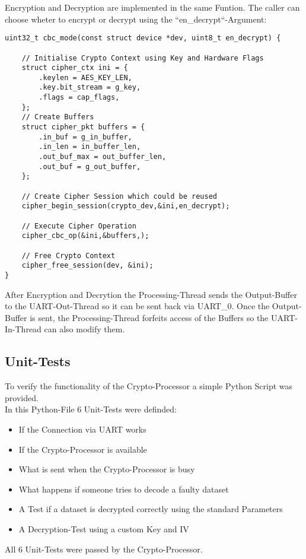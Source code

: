 Encryption and Decryption are implemented in the same Funtion.
The caller can choose wheter to encrypt or decrypt using the
``en\_decrypt``-Argument:

\begin{lstlisting}[style=CStyle,caption=Encryption and Decryption Pseudo-Code]
uint32_t cbc_mode(const struct device *dev, uint8_t en_decrypt) {

	// Initialise Crypto Context using Key and Hardware Flags
	struct cipher_ctx ini = {
		.keylen = AES_KEY_LEN,
		.key.bit_stream = g_key,
		.flags = cap_flags,
	};
	// Create Buffers
	struct cipher_pkt buffers = {
		.in_buf = g_in_buffer,
		.in_len = in_buffer_len,
		.out_buf_max = out_buffer_len,
		.out_buf = g_out_buffer,
	};

	// Create Cipher Session which could be reused
	cipher_begin_session(crypto_dev,&ini,en_decrypt);

	// Execute Cipher Operation
	cipher_cbc_op(&ini,&buffers,);

	// Free Crypto Context
	cipher_free_session(dev, &ini);
}
\end{lstlisting}

After Encryption and Decrytion the Processing-Thread sends the Output-Buffer
to the UART-Out-Thread so it can be sent back via UART\_0.
Once the Output-Buffer is sent, the Processing-Thread forfeits access of
the Buffers so the UART-In-Thread can also modify them.

\pagebreak

\subsection{Unit-Tests}

To verify the functionality of the Crypto-Processor a simple Python Script
was provided.
\\
In this Python-File 6 Unit-Tests were definded:

\begin{itemize}
	\item If the Connection via UART works
	\item If the Crypto-Processor is available
	\item What is sent when the Crypto-Processor is busy
	\item What happens if someone tries to decode a faulty dataset
	\item A Test if a dataset is decrypted correctly using the standard Parameters
	\item A Decryption-Test using a custom Key and IV
\end{itemize}

All 6 Unit-Tests were passed by the Crypto-Processor.
